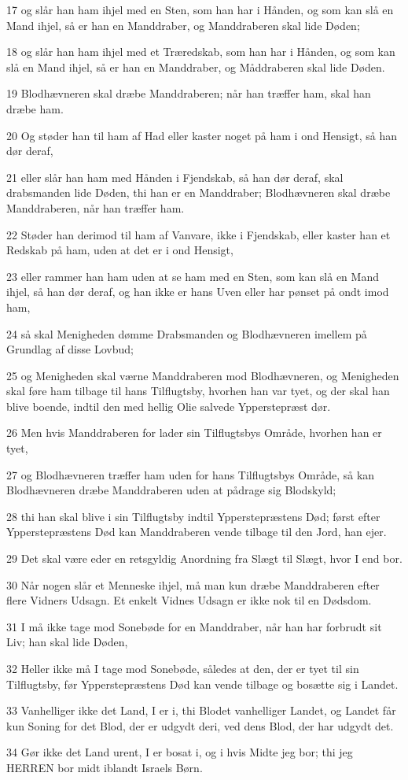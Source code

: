 \par 17 og slår han ham ihjel med en Sten, som han har i Hånden, og som kan slå en Mand ihjel, så er han en Manddraber, og Manddraberen skal lide Døden;
\par 18 og slår han ham ihjel med et Træredskab, som han har i Hånden, og som kan slå en Mand ihjel, så er han en Manddraber, og Måddraberen skal lide Døden.
\par 19 Blodhævneren skal dræbe Manddraberen; når han træffer ham, skal han dræbe ham.
\par 20 Og støder han til ham af Had eller kaster noget på ham i ond Hensigt, så han dør deraf,
\par 21 eller slår han ham med Hånden i Fjendskab, så han dør deraf, skal drabsmanden lide Døden, thi han er en Manddraber; Blodhævneren skal dræbe Manddraberen, når han træffer ham.
\par 22 Støder han derimod til ham af Vanvare, ikke i Fjendskab, eller kaster han et Redskab på ham, uden at det er i ond Hensigt,
\par 23 eller rammer han ham uden at se ham med en Sten, som kan slå en Mand ihjel, så han dør deraf, og han ikke er hans Uven eller har pønset på ondt imod ham,
\par 24 så skal Menigheden dømme Drabsmanden og Blodhævneren imellem på Grundlag af disse Lovbud;
\par 25 og Menigheden skal værne Manddraberen mod Blodhævneren, og Menigheden skal føre ham tilbage til hans Tilflugtsby, hvorhen han var tyet, og der skal han blive boende, indtil den med hellig Olie salvede Ypperstepræst dør.
\par 26 Men hvis Manddraberen for lader sin Tilflugtsbys Område, hvorhen han er tyet,
\par 27 og Blodhævneren træffer ham uden for hans Tilflugtsbys Område, så kan Blodhævneren dræbe Manddraberen uden at pådrage sig Blodskyld;
\par 28 thi han skal blive i sin Tilflugtsby indtil Ypperstepræstens Død; først efter Ypperstepræstens Død kan Manddraberen vende tilbage til den Jord, han ejer.
\par 29 Det skal være eder en retsgyldig Anordning fra Slægt til Slægt, hvor I end bor.
\par 30 Når nogen slår et Menneske ihjel, må man kun dræbe Manddraberen efter flere Vidners Udsagn. Et enkelt Vidnes Udsagn er ikke nok til en Dødsdom.
\par 31 I må ikke tage mod Sonebøde for en Manddraber, når han har forbrudt sit Liv; han skal lide Døden,
\par 32 Heller ikke må I tage mod Sonebøde, således at den, der er tyet til sin Tilflugtsby, før Ypperstepræstens Død kan vende tilbage og bosætte sig i Landet.
\par 33 Vanhelliger ikke det Land, I er i, thi Blodet vanhelliger Landet, og Landet får kun Soning for det Blod, der er udgydt deri, ved dens Blod, der har udgydt det.
\par 34 Gør ikke det Land urent, I er bosat i, og i hvis Midte jeg bor; thi jeg HERREN bor midt iblandt Israels Børn.

